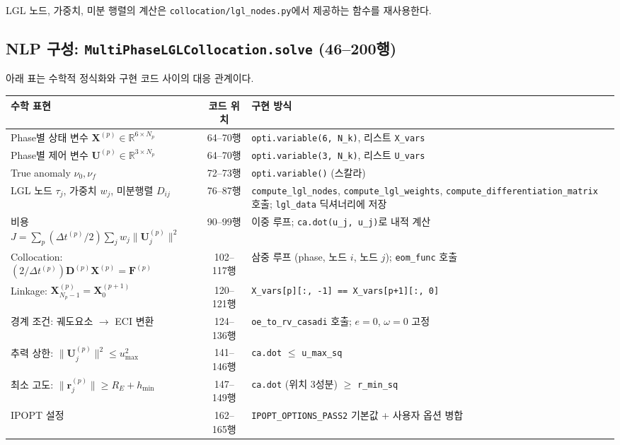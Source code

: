 \documentclass[11pt]{article}
\begin{document}
LGL 노드, 가중치, 미분 행렬의 계산은 \texttt{collocation/lgl\_nodes.py}에서 제공하는 함수를 재사용한다.


\subsection{NLP 구성: \texttt{MultiPhaseLGLCollocation.solve} (46--200행)}
\label{sec:nlp_construction}

아래 표는 수학적 정식화와 구현 코드 사이의 대응 관계이다.

\begin{table}[htbp]
\centering
\small
\begin{tabular}{p{4.5cm}cp{5.5cm}}
\toprule
수학 표현 & 코드 위치 & 구현 방식 \\
\midrule
Phase별 상태 변수 $\boldsymbol{X}^{(p)} \in \mathbb{R}^{6 \times N_p}$ & 64--70행 & \texttt{opti.variable(6, N\_k)}, 리스트 \texttt{X\_vars} \\
Phase별 제어 변수 $\boldsymbol{U}^{(p)} \in \mathbb{R}^{3 \times N_p}$ & 64--70행 & \texttt{opti.variable(3, N\_k)}, 리스트 \texttt{U\_vars} \\
True anomaly $\nu_0, \nu_f$ & 72--73행 & \texttt{opti.variable()} (스칼라) \\
LGL 노드 $\tau_j$, 가중치 $w_j$, 미분행렬 $D_{ij}$ & 76--87행 & \texttt{compute\_lgl\_nodes}, \texttt{compute\_lgl\_weights}, \texttt{compute\_differentiation\_matrix} 호출; \texttt{lgl\_data} 딕셔너리에 저장 \\
비용 $J = \sum_p (\Delta t^{(p)}/2) \sum_j w_j \|\mathbf{U}_j^{(p)}\|^2$ & 90--99행 & 이중 루프; \texttt{ca.dot(u\_j, u\_j)}로 내적 계산 \\
Collocation: $(2/\Delta t^{(p)}) \mathbf{D}^{(p)} \boldsymbol{X}^{(p)} = \mathbf{F}^{(p)}$ & 102--117행 & 삼중 루프 (phase, 노드 $i$, 노드 $j$); \texttt{eom\_func} 호출 \\
Linkage: $\mathbf{X}^{(p)}_{N_p-1} = \mathbf{X}^{(p+1)}_0$ & 120--121행 & \texttt{X\_vars[p][:, -1] == X\_vars[p+1][:, 0]} \\
경계 조건: 궤도요소 $\to$ ECI 변환 & 124--136행 & \texttt{oe\_to\_rv\_casadi} 호출; $e = 0$, $\omega = 0$ 고정 \\
추력 상한: $\|\mathbf{U}_j^{(p)}\|^2 \leq u_{\max}^2$ & 141--146행 & \texttt{ca.dot} $\leq$ \texttt{u\_max\_sq} \\
최소 고도: $\|\mathbf{r}_j^{(p)}\| \geq R_E + h_{\min}$ & 147--149행 & \texttt{ca.dot} (위치 3성분) $\geq$ \texttt{r\_min\_sq} \\
IPOPT 설정 & 162--165행 & \texttt{IPOPT\_OPTIONS\_PASS2} 기본값 + 사용자 옵션 병합 \\
\bottomrule
\end{tabular}
\end{table}
\end{document}
